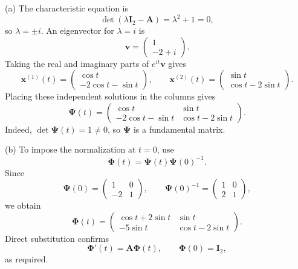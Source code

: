 \documentclass[11pt,oneside]{article}
\begin{document}
\begin{solution}
\noindent\textup{(a)} The characteristic equation is
\[
    \det(\lambda\mathbf{I}_2-\mathbf{A})=\lambda^2+1=0,
\]
so $\lambda=\pm i$. An eigenvector for $\lambda=i$ is
\[
    \mathbf{v}=\begin{pmatrix}1\\-2+i\end{pmatrix}.
\]
Taking the real and imaginary parts of $e^{it}\mathbf{v}$ gives
\[
    \mathbf{x}^{(1)}(t)=
    \begin{pmatrix}\cos t\\-2\cos t-\sin t\end{pmatrix},
    \qquad
    \mathbf{x}^{(2)}(t)=
    \begin{pmatrix}\sin t\\\cos t-2\sin t\end{pmatrix}.
\]
Placing these independent solutions in the columns gives
\[
    \boxed{
        \boldsymbol{\Psi}(t)=
        \begin{pmatrix}
            \cos t & \sin t\\
            -2\cos t-\sin t & \cos t-2\sin t
        \end{pmatrix}
    }.
\]
Indeed, $\det\boldsymbol{\Psi}(t)=1\ne0$, so $\boldsymbol{\Psi}$ is a fundamental matrix.

\medskip
\noindent\textup{(b)} To impose the normalization at $t=0$, use
\[
    \boldsymbol{\Phi}(t)
    =\boldsymbol{\Psi}(t)\boldsymbol{\Psi}(0)^{-1}.
\]
Since
\[
    \boldsymbol{\Psi}(0)
    =\begin{pmatrix}1&0\\-2&1\end{pmatrix},
    \qquad
    \boldsymbol{\Psi}(0)^{-1}
    =\begin{pmatrix}1&0\\2&1\end{pmatrix},
\]
we obtain
\[
    \boxed{
        \boldsymbol{\Phi}(t)=
        \begin{pmatrix}
            \cos t+2\sin t & \sin t\\
            -5\sin t & \cos t-2\sin t
        \end{pmatrix}
    }.
\]
Direct substitution confirms
\[
    \boldsymbol{\Phi}'(t)=\mathbf{A}\boldsymbol{\Phi}(t),
    \qquad
    \boldsymbol{\Phi}(0)=\mathbf{I}_2,
\]
as required.
\end{solution}
\end{document}
